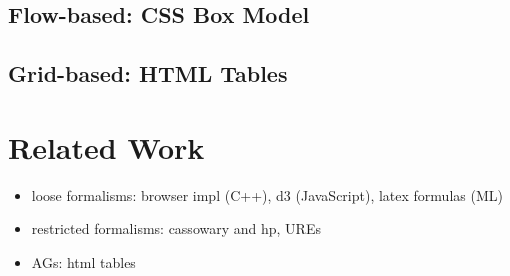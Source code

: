 \subsection{Flow-based: CSS Box Model}
\subsection{Grid-based: HTML Tables}

\section{Related Work}
\begin{itemize}
\item loose formalisms: browser impl (C++), d3 (JavaScript), latex formulas (ML)
\item restricted formalisms: cassowary and hp, UREs
\item AGs: html tables
\end{itemize}




